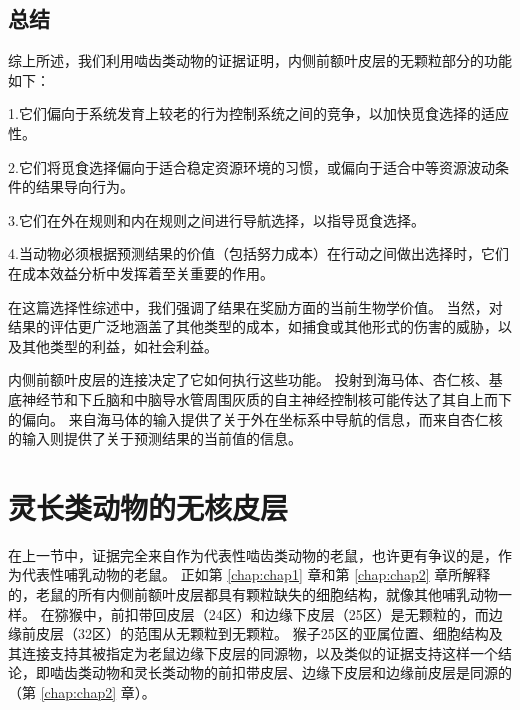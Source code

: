 \subsection{总结}

综上所述，我们利用啮齿类动物的证据证明，内侧前额叶皮层的无颗粒部分的功能如下：\par


1.它们偏向于系统发育上较老的行为控制系统之间的竞争，以加快觅食选择的适应性。\par


2.它们将觅食选择偏向于适合稳定资源环境的习惯，或偏向于适合中等资源波动条件的结果导向行为。\par


3.它们在外在规则和内在规则之间进行导航选择，以指导觅食选择。\par


4.当动物必须根据预测结果的价值（包括努力成本）在行动之间做出选择时，它们在成本效益分析中发挥着至关重要的作用。\par


在这篇选择性综述中，我们强调了结果在奖励方面的当前生物学价值。
当然，对结果的评估更广泛地涵盖了其他类型的成本，如捕食或其他形式的伤害的威胁，以及其他类型的利益，如社会利益。\par


内侧前额叶皮层的连接决定了它如何执行这些功能。
投射到海马体、杏仁核、基底神经节和下丘脑和中脑导水管周围灰质的自主神经控制核可能传达了其自上而下的偏向。
来自海马体的输入提供了关于外在坐标系中导航的信息，而来自杏仁核的输入则提供了关于预测结果的当前值的信息。\par



\section{灵长类动物的无核皮层}

在上一节中，证据完全来自作为代表性啮齿类动物的老鼠，也许更有争议的是，作为代表性哺乳动物的老鼠。
正如第 \ref{chap:chap1} 章和第 \ref{chap:chap2} 章所解释的，老鼠的所有内侧前额叶皮层都具有颗粒缺失的细胞结构，就像其他哺乳动物一样。
在猕猴中，前扣带回皮层（24区）和边缘下皮层（25区）是无颗粒的，而边缘前皮层（32区）的范围从无颗粒到无颗粒\cite{Vogt&Derbyshire,2009;Mackey&Petrides,2010}。
猴子25区的亚属位置、细胞结构及其连接\cite{freedman2000subcortical}支持其被指定为老鼠边缘下皮层的同源物，以及类似的证据支持这样一个结论，即啮齿类动物和灵长类动物的前扣带皮层、边缘下皮层和边缘前皮层是同源的（第 \ref{chap:chap2} 章）。\par



